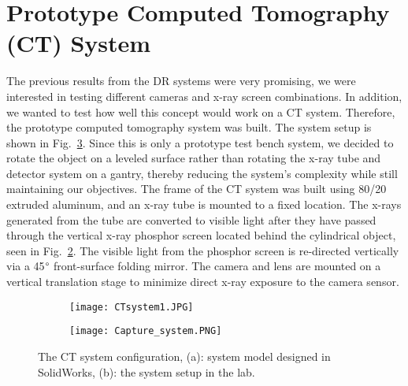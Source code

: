 \section{Prototype Computed Tomography (CT) System}
The previous results from the DR systems were very promising, we were interested in testing different cameras and x-ray screen combinations.  In addition, we wanted to test how well this concept would work on a CT system.  Therefore, the prototype computed tomography system was built.  The system setup is shown in Fig.~\ref{fig:CTsystem}.  Since this is only a prototype test bench system, we decided to rotate the object on a leveled surface rather than rotating the x-ray tube and detector system on a gantry, thereby reducing the system's complexity while still maintaining our objectives.  The frame of the CT system was built using 80/20 extruded aluminum, and an x-ray tube is mounted to a fixed location.  The x-rays generated from the tube are converted to visible light after they have passed through the vertical x-ray phosphor screen located behind the cylindrical object, seen in Fig.~\ref{fig:CTlab}.  The visible light from the phosphor screen is re-directed vertically via a 45$\degree$ front-surface folding mirror.  The camera and lens are mounted on a vertical translation stage to minimize direct x-ray exposure to the camera sensor.

\begin{figure}[h]
	\begin{subfigure}[b]{0.45\linewidth}
	\centering
	\texttt{[image: CTsystem1.JPG]}
	\caption{}
	\label{fig:CTmodel}
	\end{subfigure}
\hspace{1 cm}
	\begin{subfigure}[b]{0.45\linewidth}
	\centering
	\texttt{[image: Capture\_system.PNG]}
	\caption{}
	\label{fig:CTlab}
	\end{subfigure}
\caption{The CT system configuration, (a): system model designed in SolidWorks, (b): the system setup in the lab.}
\label{fig:CTsystem}
\end{figure}

